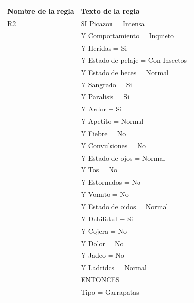 \documentclass[a4paper,table,xcdraw]{article}
\begin{document}
\begin{table}[H]
\centering
\begin{tabular}{|l|l|}
\hline
\textbf{Nombre de la regla} & Texto de la regla \\ \hline
R2 & SI Picazon = Intensa \\
  & Y Comportamiento = Inquieto \\
  & Y Heridas = Si \\
  & Y Estado de pelaje = Con Insectos \\
  & Y Estado de heces = Normal \\
  & Y Sangrado = Si \\
  & Y Paralisis = Si \\
  & Y Ardor = Si \\
  & Y Apetito = Normal \\
  & Y Fiebre = No \\
  & Y Convulsiones = No \\
  & Y Estado de ojos = Normal \\
  & Y Tos = No \\
  & Y Estornudos = No \\
  & Y Vomito = No \\
  & Y Estado de oidos = Normal \\
  & Y Debilidad = Si \\
  & Y Cojera = No \\
  & Y Dolor = No \\
  & Y Jadeo = No \\
  & Y Ladridos = Normal \\
  &   ENTONCES \\
  & Tipo = Garrapatas \\ \hline
\end{tabular}
\end{table}
\end{document}
